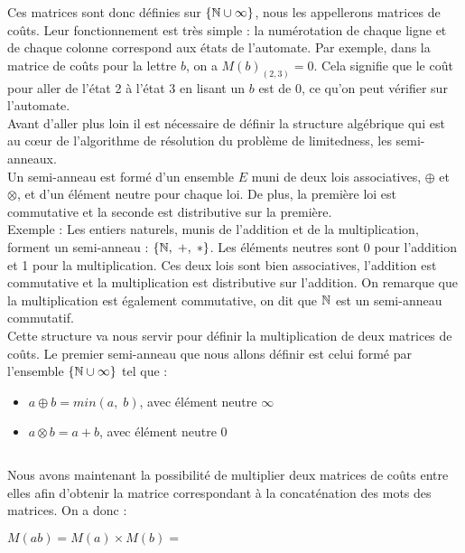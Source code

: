 \documentclass{report}
\begin{document}
Ces matrices sont donc définies sur $\{\mathbb{N} \cup \infty\}$, nous les appellerons matrices de coûts. Leur fonctionnement est très simple : la numérotation de chaque ligne et de chaque colonne correspond aux états de l'automate. Par exemple, dans la matrice de coûts pour la lettre $b$, on a $M(b)_{(2,3)}=0$. Cela signifie que le coût pour aller de l'état 2 à l'état 3 en lisant un $b$ est de 0, ce qu'on peut vérifier sur l'automate. \\

Avant d'aller plus loin il est nécessaire de définir la structure algébrique qui est au cœur de l'algorithme de résolution du problème de limitedness, les semi-anneaux.\\
Un semi-anneau est formé d'un ensemble $E$ muni de deux lois associatives, $\oplus$ et $\otimes$, et d'un élément neutre pour chaque loi. De plus, la première loi est commutative et la seconde est distributive sur la première.\\
Exemple : Les entiers naturels, munis de l'addition et de la multiplication, forment un semi-anneau : $\{ \mathbb{N},\;+,\;* \}$. Les éléments neutres sont 0 pour l'addition et 1 pour la multiplication. Ces deux lois sont bien associatives, l'addition est commutative et la multiplication est distributive sur l'addition. On remarque que la multiplication est également commutative, on dit que $\mathbb{N}$ est un semi-anneau commutatif.\\

Cette structure va nous servir pour définir la multiplication de deux matrices de coûts. Le premier semi-anneau que nous allons définir est celui formé par l'ensemble $\{\mathbb{N} \cup \infty\}$ tel que :
\begin{itemize}
\item $a \oplus b = min(a,\;b)$, avec élément neutre $\infty$
\item $a \otimes b = a + b$, avec élément neutre $0$
\end{itemize}
$\ $

Nous avons maintenant la possibilité de multiplier deux matrices de coûts entre elles afin d'obtenir la matrice correspondant à la concaténation des mots des matrices. On a donc :
\begin{center}
$M(ab) = M(a) \times M(b) =$
\end{center}
$\ $
\end{document}
